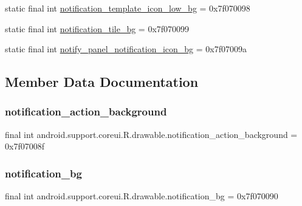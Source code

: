 \begin{DoxyCompactItemize}
\item 
static final int \mbox{\hyperlink{classandroid_1_1support_1_1coreui_1_1R_1_1drawable_a6aa5ebe8043d2f7155705c4988e46024}{notification\+\_\+template\+\_\+icon\+\_\+low\+\_\+bg}} = 0x7f070098
\item 
static final int \mbox{\hyperlink{classandroid_1_1support_1_1coreui_1_1R_1_1drawable_aa40d9d7403b9046f03181c7e8fa6b217}{notification\+\_\+tile\+\_\+bg}} = 0x7f070099
\item 
static final int \mbox{\hyperlink{classandroid_1_1support_1_1coreui_1_1R_1_1drawable_a8fad725edb38a205968e9df2ec8754fc}{notify\+\_\+panel\+\_\+notification\+\_\+icon\+\_\+bg}} = 0x7f07009a
\end{DoxyCompactItemize}


\subsection{Member Data Documentation}
\mbox{\label{classandroid_1_1support_1_1coreui_1_1R_1_1drawable_a82491dac97c48bc1455f0385a70b2ddf}} 
\subsubsection{\texorpdfstring{notification\+\_\+action\+\_\+background}{notification\_action\_background}}
{\footnotesize\ttfamily final int android.\+support.\+coreui.\+R.\+drawable.\+notification\+\_\+action\+\_\+background = 0x7f07008f\hspace{0.3cm}{\ttfamily [static]}}

\mbox{\label{classandroid_1_1support_1_1coreui_1_1R_1_1drawable_a1c8146145db024a50e235921fc2cc2da}} 
\subsubsection{\texorpdfstring{notification\+\_\+bg}{notification\_bg}}
{\footnotesize\ttfamily final int android.\+support.\+coreui.\+R.\+drawable.\+notification\+\_\+bg = 0x7f070090\hspace{0.3cm}{\ttfamily [static]}}

